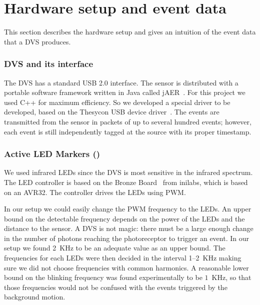 \vfill\pagebreak


\section{Hardware setup and event data\label{sec:Hardware-setup-and}}

This section describes the hardware setup and gives an intuition of
the event data that a DVS produces.


\subsubsection{DVS and its interface\label{sec:interface}}

The DVS has a standard USB 2.0 interface. The sensor is distributed
with a portable software framework written in Java called jAER~\cite{jaer}.
For this project we used C++ for maximum efficiency. So we developed
a special driver to be developed, based on the Thesycon USB device
driver~\cite{thesycon}. The events are transmitted from the sensor
in packets of up to several hundred events; however, each event is
still independently tagged at the source with its proper timestamp.



\subsubsection{Active LED Markers (\ALMs)\label{sec:leds}}

We used infrared LEDs since the DVS is most sensitive in the infrared
spectrum.  The LED controller is based on the Bronze Board~\cite{bronzeboard}
from inilabs, which is based on an AVR32.  The controller drives
the LEDs using PWM.



In our setup we could easily change the PWM frequency to the LEDs.
An upper bound on the detectable frequency depends on the power of
the LEDs and the distance to the sensor. A DVS is not magic: there
must be a large enough change in the number of photons reaching the
photoreceptor to trigger an event. In our setup we found 2~KHz to
be an adequate value as an upper bound. The frequencies for each LEDs
were then decided in the interval 1--2~KHz making sure we did not
choose frequencies with common harmonics. A reasonable lower bound
on the blinking frequency was found experimentally to be $1$~KHz,
so that those frequencies would not be confused with the events triggered
by the background motion.


